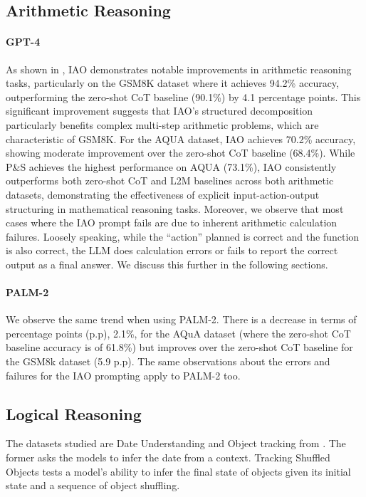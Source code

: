 


\subsection{Arithmetic Reasoning} 

\paragraph{GPT-4} As shown in , IAO demonstrates notable improvements in arithmetic reasoning tasks, particularly on the GSM8K dataset where it achieves 94.2\% accuracy, outperforming the zero-shot CoT baseline (90.1\%) by 4.1 percentage points. This significant improvement suggests that IAO's structured decomposition particularly benefits complex multi-step arithmetic problems, which are characteristic of GSM8K. For the AQUA dataset, IAO achieves 70.2\% accuracy, showing moderate improvement over the zero-shot CoT baseline (68.4\%). While P\&S achieves the highest performance on AQUA (73.1\%), IAO consistently outperforms both zero-shot CoT and L2M baselines across both arithmetic datasets, demonstrating the effectiveness of explicit input-action-output structuring in mathematical reasoning tasks.
 Moreover, we observe that most cases where the IAO prompt fails are due to inherent arithmetic calculation failures. Loosely speaking, while the ``action'' planned is correct and the function is also correct, the LLM does calculation errors or fails to report the correct output as a final answer. We discuss this further in the following sections. 

\paragraph{PALM-2} We observe the same trend when using PALM-2.
There is a decrease in terms of percentage points (p.p), 2.1\%, for the AQuA dataset (where the zero-shot CoT baseline accuracy is of 61.8\%) but improves over the zero-shot CoT baseline for the GSM8k dataset (5.9 p.p). The same observations about the errors and failures for the IAO prompting apply to PALM-2 too.

\subsection{Logical Reasoning}
The datasets studied are Date Understanding and Object tracking from \cite{srivastava2023beyond}. The former asks the models
to infer the date from a context. Tracking Shuffled Objects tests a model’s ability to infer the final state of objects given its initial state and a sequence of object shuffling. 
